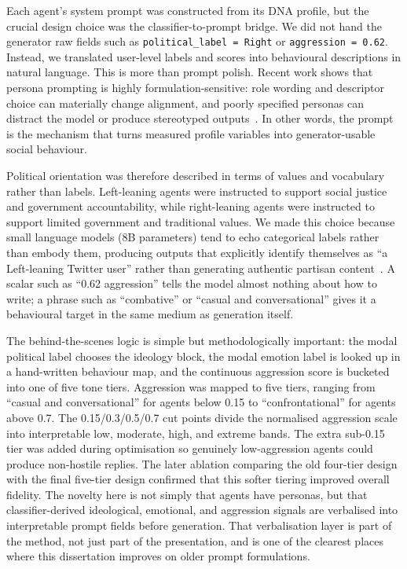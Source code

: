 \documentclass[logo,bsc,singlespacing,parskip,online]{infthesis}
\begin{document}
Each agent's system prompt was constructed from its DNA profile, but the crucial design choice was the classifier-to-prompt bridge. We did not hand the generator raw fields such as \texttt{political\_label = Right} or \texttt{aggression = 0.62}. Instead, we translated user-level labels and scores into behavioural descriptions in natural language. This is more than prompt polish. Recent work shows that persona prompting is highly formulation-sensitive: role wording and descriptor choice can materially change alignment, and poorly specified personas can distract the model or produce stereotyped outputs~\citep{kim2024persona,lutz2025prompt}. In other words, the prompt is the mechanism that turns measured profile variables into generator-usable social behaviour.

Political orientation was therefore described in terms of values and vocabulary rather than labels. Left-leaning agents were instructed to support social justice and government accountability, while right-leaning agents were instructed to support limited government and traditional values. We made this choice because small language models (8B parameters) tend to echo categorical labels rather than embody them, producing outputs that explicitly identify themselves as ``a Left-leaning Twitter user'' rather than generating authentic partisan content~\citep{park2023generative}. A scalar such as ``0.62 aggression'' tells the model almost nothing about how to write; a phrase such as ``combative'' or ``casual and conversational'' gives it a behavioural target in the same medium as generation itself.

The behind-the-scenes logic is simple but methodologically important: the modal political label chooses the ideology block, the modal emotion label is looked up in a hand-written behaviour map, and the continuous aggression score is bucketed into one of five tone tiers. Aggression was mapped to five tiers, ranging from ``casual and conversational'' for agents below 0.15 to ``confrontational'' for agents above 0.7. The 0.15/0.3/0.5/0.7 cut points divide the normalised aggression scale into interpretable low, moderate, high, and extreme bands. The extra sub-0.15 tier was added during optimisation so genuinely low-aggression agents could produce non-hostile replies. The later ablation comparing the old four-tier design with the final five-tier design confirmed that this softer tiering improved overall fidelity. The novelty here is not simply that agents have personas, but that classifier-derived ideological, emotional, and aggression signals are verbalised into interpretable prompt fields before generation. That verbalisation layer is part of the method, not just part of the presentation, and is one of the clearest places where this dissertation improves on older prompt formulations.
\end{document}

